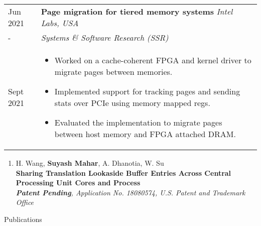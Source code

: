 \documentclass{article}
\newlength{\workexitemsep}
\newlength{\sectionbottommargin}
\newlength{\durlen}
\newlength{\deslen}
\newenvironment{nothing}{}
\newcommand{\sectiontitle}[1]{
  \textbf{\Large{\sffamily #1}}
  \begin{flushright}
      \vspace{-0.48cm} 
      \rule{0.975\textwidth}{1.1pt}
  \end{flushright}
  \vspace{-0.1cm} 
}
\begin{document}
\begin{tabular}{p{\durlen} p{\deslen}}
  \centering Jun 2021       & \textbf{Page migration for tiered memory systems} \hfill \textit{Intel Labs, USA} \\
  \centering -              & \textit{Systems \& Software Research (SSR)} \\ 
  \centering Sept 2021      & \vspace{-0.6cm}\begin{itemize}[itemsep=\workexitemsep] 
          \item Worked on a cache-coherent FPGA and kernel driver to migrate pages between memories.
          \item Implemented support for tracking pages and sending stats over PCIe using memory mapped regs.
          \item Evaluated the implementation to migrate pages between host memory and FPGA attached DRAM.
  \end{itemize}
\end{tabular}

\vspace{-0.2cm}


\vspace{-3mm}

\begin{nothing}
    \vspace{\sectionbottommargin} 
    
    \ifdefined\resume
        \vspace{-0.2cm} 
    \fi 

    \begin{enumerate}
            \item H. Wang, \textbf{Suyash Mahar}, A. Dhanotia, W. Su\\
        \textbf{Sharing Translation Lookaside Buffer Entries Across Central Processing Unit 
          Cores and Process} \\
        {\it\footnotesize \textbf{Patent Pending}, Application No. 18080574, U.S. Patent and Trademark Office}
        
    \end{enumerate}
\end{nothing}


\sectiontitle{Publications} 
\end{document}
